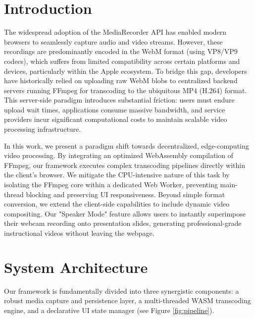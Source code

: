 \documentclass[10pt,twocolumn,letterpaper]{article}
\begin{document}
\section{Introduction}

The widespread adoption of the MediaRecorder API has enabled modern browsers to seamlessly capture audio and video streams. However, these recordings are predominantly encoded in the WebM format (using VP8/VP9 codecs), which suffers from limited compatibility across certain platforms and devices, particularly within the Apple ecosystem. To bridge this gap, developers have historically relied on uploading raw WebM blobs to centralized backend servers running FFmpeg for transcoding to the ubiquitous MP4 (H.264) format. This server-side paradigm introduces substantial friction: users must endure upload wait times, applications consume massive bandwidth, and service providers incur significant computational costs to maintain scalable video processing infrastructure.

In this work, we present a paradigm shift towards decentralized, edge-computing video processing. By integrating an optimized WebAssembly compilation of FFmpeg, our framework executes complex transcoding pipelines directly within the client's browser. We mitigate the CPU-intensive nature of this task by isolating the FFmpeg core within a dedicated Web Worker, preventing main-thread blocking and preserving UI responsiveness. Beyond simple format conversion, we extend the client-side capabilities to include dynamic video compositing. Our "Speaker Mode" feature allows users to instantly superimpose their webcam recording onto presentation slides, generating professional-grade instructional videos without leaving the webpage.



\section{System Architecture}

Our framework is fundamentally divided into three synergistic components: a robust media capture and persistence layer, a multi-threaded WASM transcoding engine, and a declarative UI state manager (see Figure \ref{fig:pipeline}).

\end{document}
